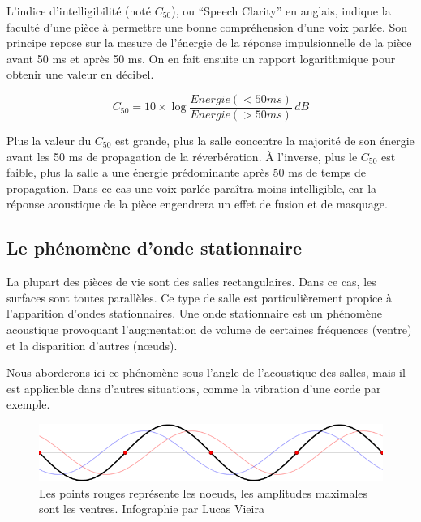 \documentclass[
  letterpaper,
  DIV=11,
  numbers=noendperiod]{scrreprt}
\begin{document}
L'indice d'intelligibilité (noté \(C_{50}\)), ou ``Speech Clarity'' en
anglais, indique la faculté d'une pièce à permettre une bonne
compréhension d'une voix parlée. Son principe repose sur la mesure de
l'énergie de la réponse impulsionnelle de la pièce avant 50 ms et après
50 ms. On en fait ensuite un rapport logarithmique pour obtenir une
valeur en décibel.

\[ C_{50} = 10 \times \log \frac{Energie(<50ms)}{Energie(>50ms)} \, dB \]

Plus la valeur du \(C_{50}\) est grande, plus la salle concentre la
majorité de son énergie avant les 50 ms de propagation de la
réverbération. À l'inverse, plus le \(C_{50}\) est faible, plus la salle
a une énergie prédominante après 50 ms de temps de propagation. Dans ce
cas une voix parlée paraîtra moins intelligible, car la réponse
acoustique de la pièce engendrera un effet de fusion et de masquage.

\hypertarget{le-phuxe9nomuxe8ne-donde-stationnaire}{%
\subsection{Le phénomène d'onde
stationnaire}\label{le-phuxe9nomuxe8ne-donde-stationnaire}}

La plupart des pièces de vie sont des salles rectangulaires. Dans ce
cas, les surfaces sont toutes parallèles. Ce type de salle est
particulièrement propice à l'apparition d'ondes stationnaires. Une onde
stationnaire est un phénomène acoustique provoquant l'augmentation de
volume de certaines fréquences (ventre) et la disparition d'autres
(nœuds).

Nous aborderons ici ce phénomène sous l'angle de l'acoustique des
salles, mais il est applicable dans d'autres situations, comme la
vibration d'une corde par exemple.

\begin{figure}

{\centering \includegraphics{generalites/../_resources/gif/Standing_wave_2.png}

}

\caption{\label{fig-onde_stat}Les points rouges représente les noeuds,
les amplitudes maximales sont les ventres. Infographie par Lucas Vieira}

\end{figure}
\end{document}

